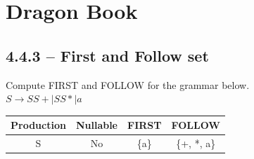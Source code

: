 \documentclass[letterpaper, 10pt]{article}
\begin{document}
\section{Dragon Book}
\subsection{4.4.3 -- First and Follow set}
Compute FIRST and FOLLOW for the grammar below. \\

$S \to S S + | S S * | a$

\begin{center}
\begin{table}[h]
\begin{tabular}{|c|c|c|c|}
\hline
\textbf{Production} & \textbf{Nullable} & \textbf{FIRST} & \textbf{FOLLOW} \\
\hline
    S & No & \{a\} & \{+, *, a\} \\
\hline
\end{tabular}
\end{table}
\end{center}
\end{document}
